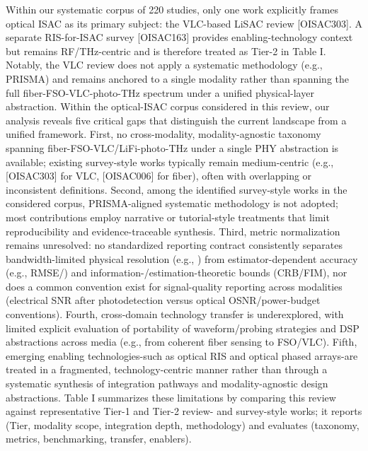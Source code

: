 {} Within our systematic corpus of 220 studies, only one work explicitly frames optical ISAC as its primary subject: the VLC-based LiSAC review [O\markdownRendererUnderscore{}ISAC\markdownRendererUnderscore{}303]. A separate RIS-for-ISAC survey [O\markdownRendererUnderscore{}ISAC\markdownRendererUnderscore{}163] provides enabling-technology context but remains RF/THz-centric and is therefore treated as Tier-2 in Table I. Notably, the VLC review does not apply a systematic methodology (e.g., PRISMA) and remains anchored to a single modality rather than spanning the full fiber-FSO-VLC-photo-THz spectrum under a unified physical-layer abstraction.\markdownRendererParagraphSeparator
{} Within the optical-ISAC corpus considered in this review, our analysis reveals five critical gaps that distinguish the current landscape from a unified framework. First, no cross-modality, modality-agnostic taxonomy spanning fiber-FSO-VLC/LiFi-photo-THz under a single PHY abstraction is available; existing survey-style works typically remain medium-centric (e.g., [O\markdownRendererUnderscore{}ISAC\markdownRendererUnderscore{}303] for VLC, [O\markdownRendererUnderscore{}ISAC\markdownRendererUnderscore{}006] for fiber), often with overlapping or inconsistent definitions. Second, among the identified survey-style works in the considered corpus, PRISMA-aligned systematic methodology is not adopted; most contributions employ narrative or tutorial-style treatments that limit reproducibility and evidence-traceable synthesis. Third, metric normalization remains unresolved: no standardized reporting contract consistently separates bandwidth-limited physical resolution (e.g., ) from estimator-dependent accuracy (e.g., RMSE/) and information-/estimation-theoretic bounds (CRB/FIM), nor does a common convention exist for signal-quality reporting across modalities (electrical SNR after photodetection versus optical OSNR/power-budget conventions). Fourth, cross-domain technology transfer is underexplored, with limited explicit evaluation of portability of waveform/probing strategies and DSP abstractions across media (e.g., from coherent fiber sensing to FSO/VLC). Fifth, emerging enabling technologies-such as optical RIS and optical phased arrays-are treated in a fragmented, technology-centric manner rather than through a systematic synthesis of integration pathways and modality-agnostic design abstractions. Table I summarizes these limitations by comparing this review against representative Tier-1 and Tier-2 review- and survey-style works; it reports  (Tier, modality scope, integration depth, methodology) and evaluates  (taxonomy, metrics, benchmarking, transfer, enablers).\markdownRendererParagraphSeparator
